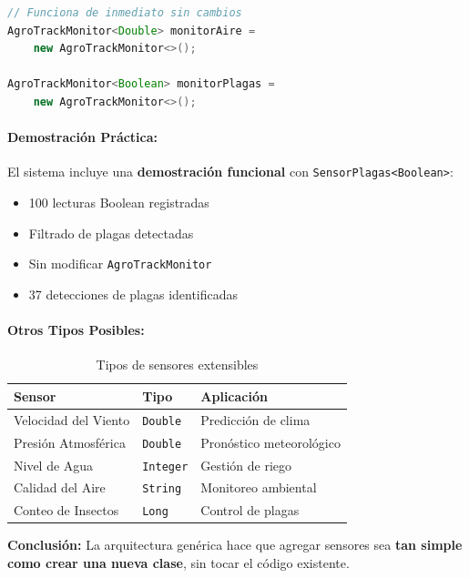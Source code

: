 \documentclass[12pt,a4paper]{article}
\begin{document}
\begin{lstlisting}[language=Java]
// Funciona de inmediato sin cambios
AgroTrackMonitor<Double> monitorAire = 
    new AgroTrackMonitor<>();
    
AgroTrackMonitor<Boolean> monitorPlagas = 
    new AgroTrackMonitor<>();
\end{lstlisting}

\paragraph{Demostración Práctica:}

El sistema incluye una \textbf{demostración funcional} con \texttt{SensorPlagas<Boolean>}:

\begin{itemize}
    \item[$\bullet$] 100 lecturas Boolean registradas
    \item[$\bullet$] Filtrado de plagas detectadas
    \item[$\bullet$] Sin modificar \texttt{AgroTrackMonitor}
    \item[$\bullet$] 37 detecciones de plagas identificadas
\end{itemize}

\paragraph{Otros Tipos Posibles:}

\begin{table}[h]
\centering
\begin{tabular}{|l|l|p{5cm}|}
\hline
\rowcolor{agrogreen!20}
\textbf{Sensor} & \textbf{Tipo} & \textbf{Aplicación} \\
\hline
Velocidad del Viento & \texttt{Double} & Predicción de clima \\
Presión Atmosférica & \texttt{Double} & Pronóstico meteorológico \\
Nivel de Agua & \texttt{Integer} & Gestión de riego \\
Calidad del Aire & \texttt{String} & Monitoreo ambiental \\
Conteo de Insectos & \texttt{Long} & Control de plagas \\
\hline
\end{tabular}
\caption{Tipos de sensores extensibles}
\label{tab:sensores-extensibles}
\end{table}

\textbf{Conclusión:} La arquitectura genérica hace que agregar sensores sea \textbf{tan simple como crear una nueva clase}, sin tocar el código existente.
\end{document}
